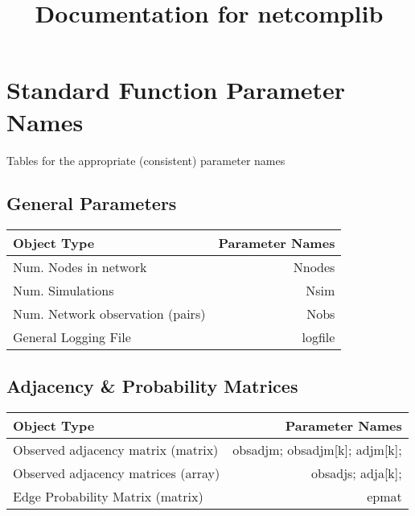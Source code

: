 \documentclass[11pt]{article}
\begin{document}
\title{Documentation for netcomplib}

\maketitle
\tableofcontents
\pagebreak


\section{Standard Function Parameter Names}
Tables for the appropriate (consistent) parameter names

\subsection{General Parameters}
\begin{tabular}{|l|r|}
\hline
{\bf Object Type} & {\bf Parameter Names} \\


\hline
Num. Nodes in network & Nnodes \\

\hline
Num. Simulations & Nsim \\

\hline
Num. Network observation (pairs) & Nobs \\

\hline 
General Logging File	 & logfile \\

\hline
\end{tabular}



\subsection{Adjacency \& Probability Matrices}
\begin{tabular}{|l|r|}
\hline
{\bf Object Type} & {\bf Parameter Names} \\


\hline
Observed adjacency matrix (matrix) & obsadjm; obsadjm[k]; adjm[k];\\

\hline 
Observed adjacency matrices (array) & obsadjs; adja[k]; \\

\hline
Edge Probability Matrix (matrix) & epmat \\

\hline
\end{tabular}
\end{document}

